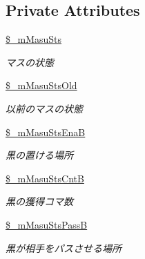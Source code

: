 \subsection*{Private Attributes}
\begin{DoxyCompactItemize}
\item 
\mbox{\label{class_reversi_a22a84a78f0a3b0f9931591298e2da4d7}} 
\hyperlink{class_reversi_a22a84a78f0a3b0f9931591298e2da4d7}{\$\+\_\+m\+Masu\+Sts}
\begin{DoxyCompactList}\small\item\em マスの状態 \end{DoxyCompactList}\item 
\mbox{\label{class_reversi_af7aec5a588ed3b17db84cd79c2e2599d}} 
\hyperlink{class_reversi_af7aec5a588ed3b17db84cd79c2e2599d}{\$\+\_\+m\+Masu\+Sts\+Old}
\begin{DoxyCompactList}\small\item\em 以前のマスの状態 \end{DoxyCompactList}\item 
\mbox{\label{class_reversi_a9fd66ba0b00c0bab1f84e64526653c38}} 
\hyperlink{class_reversi_a9fd66ba0b00c0bab1f84e64526653c38}{\$\+\_\+m\+Masu\+Sts\+EnaB}
\begin{DoxyCompactList}\small\item\em 黒の置ける場所 \end{DoxyCompactList}\item 
\mbox{\label{class_reversi_a24c5cf73681d3920c3330e9d0afaf3a2}} 
\hyperlink{class_reversi_a24c5cf73681d3920c3330e9d0afaf3a2}{\$\+\_\+m\+Masu\+Sts\+CntB}
\begin{DoxyCompactList}\small\item\em 黒の獲得コマ数 \end{DoxyCompactList}\item 
\mbox{\label{class_reversi_a384407818dc2c9378716ee1f135b9f01}} 
\hyperlink{class_reversi_a384407818dc2c9378716ee1f135b9f01}{\$\+\_\+m\+Masu\+Sts\+PassB}
\begin{DoxyCompactList}\small\item\em 黒が相手をパスさせる場所 \end{DoxyCompactList}\item 
\mbox{\label{class_reversi_ade4534b9cb287ab570e5cbd9c6b8099c}} 

\end{DoxyCompactItemize}
